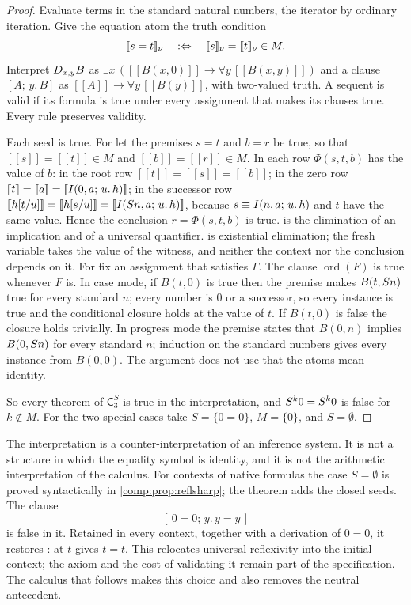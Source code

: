 \begin{proof}
Evaluate terms in the standard natural numbers, the iterator by ordinary
iteration. Give the equation atom the truth condition
\[
 [\![s=t]\!]_\nu\quad\mathrel{:\Leftrightarrow}\quad
 [\![s]\!]_\nu=[\![t]\!]_\nu\in M .
\]
Interpret $D_{x,y}B$ as
$\exists x\,([\![B(x,0)]\!]\to\forall y\,[\![B(x,y)]\!])$ and a clause
$[A;\,y.\,B]$ as $[\![A]\!]\to\forall y\,[\![B(y)]\!]$, with two-valued
truth. A sequent is valid if its formula is true under every assignment
that makes its clauses true. Every rule preserves validity.

Each seed is true. For  let the premises $s=t$ and $b=r$ be
true, so that $[\![s]\!]=[\![t]\!]\in M$ and $[\![b]\!]=[\![r]\!]\in M$. In
each row $\Phi(s,t,b)$ has the value of $b$: in the root row
$[\![t]\!]=[\![s]\!]=[\![b]\!]$; in the zero row
$[\![t]\!]=[\![a]\!]=[\![I(0,a;\,u.\,h)]\!]$; in the successor row
$[\![h[t/u]]\!]=[\![h[s/u]]\!]=[\![I(S n,a;\,u.\,h)]\!]$,
because $s\equiv I(n,a;\,u.\,h)$ and $t$ have the same value. Hence the
conclusion $r=\Phi(s,t,b)$ is true.  is the elimination of
an implication and of a universal quantifier.  is
existential elimination; the fresh variable takes the value of the
witness, and neither the context nor the conclusion depends on it. For
 fix an assignment that satisfies $\Gamma$. The clause
$\operatorname{ord}(F)$ is true whenever $F$ is.
In case mode, if
$B(t,0)$ is true then the premise makes $B(t,S n)$ true for every
standard $n$; every number is $0$ or a successor, so every instance is
true and the conditional closure holds at the value of $t$. If $B(t,0)$ is
false the closure holds trivially. In progress mode the premise states
that $B(0,n)$ implies $B(0,S n)$ for every standard $n$; induction on
the standard numbers gives every instance from $B(0,0)$. The argument does
not use that the atoms mean identity.

So every theorem of $\mathsf{C}_3^{S}$ is true in the interpretation, and
$S^k0=S^k0$ is false for $k\notin M$. For the two special cases take
$S=\{0=0\}$, $M=\{0\}$, and $S=\emptyset$.
\end{proof}

The interpretation is a counter-interpretation of an inference system. It
is not a structure in which the equality symbol is identity, and it is not
the arithmetic interpretation of the calculus. For contexts of native
formulas the case $S=\emptyset$ is proved syntactically in
\cref{comp:prop:reflsharp}; the theorem adds the closed seeds. The clause
\[
 [\,0=0;\,y.\,y=y\,]
\]
is false in it. Retained in every context, together with a derivation of
$0=0$, it restores :  at $t$ gives $t=t$. This
relocates universal reflexivity into the initial context; the axiom and
the cost of validating it remain part of the specification. The calculus
that follows makes this choice and also removes the neutral antecedent.

